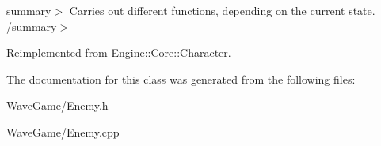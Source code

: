 summary$>$ Carries out different functions, depending on the current state. /summary$>$ 

Reimplemented from \hyperlink{class_engine_1_1_core_1_1_character_a2156c371584ca6a8d2961154f1b49c09}{Engine\+::\+Core\+::\+Character}.



The documentation for this class was generated from the following files\+:\begin{DoxyCompactItemize}
\item 
Wave\+Game/Enemy.\+h\item 
Wave\+Game/Enemy.\+cpp\end{DoxyCompactItemize}
